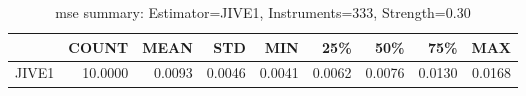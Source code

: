\begin{table}[ht]
\centering
\caption{mse summary: Estimator=JIVE1, Instruments=333, Strength=0.30}
\begin{tabular}{lrrrrrrrr}
\toprule
 & COUNT & MEAN & STD & MIN & 25\% & 50\% & 75\% & MAX \\
\midrule
JIVE1 & 10.0000 & 0.0093 & 0.0046 & 0.0041 & 0.0062 & 0.0076 & 0.0130 & 0.0168 \\
\bottomrule
\end{tabular}
\end{table}
